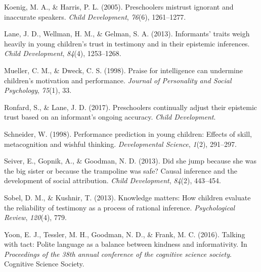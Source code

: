\documentclass[10pt, letterpaper]{article}
\begin{document}
\hypertarget{ref-Koenig:2005p146}{}
Koenig, M. A., \& Harris, P. L. (2005). Preschoolers mistrust ignorant
and inaccurate speakers. \emph{Child Development}, \emph{76}(6),
1261--1277.

\hypertarget{ref-lane2013informants}{}
Lane, J. D., Wellman, H. M., \& Gelman, S. A. (2013). Informants' traits
weigh heavily in young children's trust in testimony and in their
epistemic inferences. \emph{Child Development}, \emph{84}(4),
1253--1268.

\hypertarget{ref-mueller1998praise}{}
Mueller, C. M., \& Dweck, C. S. (1998). Praise for intelligence can
undermine children's motivation and performance. \emph{Journal of
Personality and Social Psychology}, \emph{75}(1), 33.

\hypertarget{ref-ronfard2017preschoolers}{}
Ronfard, S., \& Lane, J. D. (2017). Preschoolers continually adjust
their epistemic trust based on an informant's ongoing accuracy.
\emph{Child Development}.

\hypertarget{ref-schneider1998performance}{}
Schneider, W. (1998). Performance prediction in young children: Effects
of skill, metacognition and wishful thinking. \emph{Developmental
Science}, \emph{1}(2), 291--297.

\hypertarget{ref-seiver2013did}{}
Seiver, E., Gopnik, A., \& Goodman, N. D. (2013). Did she jump because
she was the big sister or because the trampoline was safe? Causal
inference and the development of social attribution. \emph{Child
Development}, \emph{84}(2), 443--454.

\hypertarget{ref-sobel2013knowledge}{}
Sobel, D. M., \& Kushnir, T. (2013). Knowledge matters: How children
evaluate the reliability of testimony as a process of rational
inference. \emph{Psychological Review}, \emph{120}(4), 779.

\hypertarget{ref-yoon2016talking}{}
Yoon, E. J., Tessler, M. H., Goodman, N. D., \& Frank, M. C. (2016).
Talking with tact: Polite language as a balance between kindness and
informativity. In \emph{Proceedings of the 38th annual conference of the
cognitive science society}. Cognitive Science Society.
\end{document}
